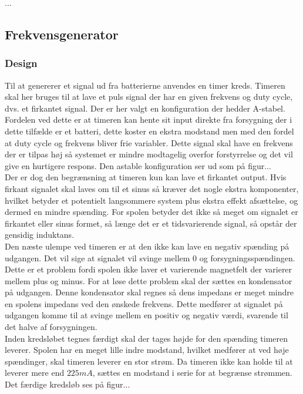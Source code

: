 ...

\subsection{Frekvensgenerator}

\subsubsection{Design}
Til at genererer et signal ud fra batterierne anvendes en timer kreds. Timeren skal her bruges til at lave et puls signal der har en given frekvens og duty cycle, dvs. et firkantet signal. Der er her valgt en konfiguration der hedder A-stabel. Fordelen ved dette er at timeren kan hente sit input direkte fra forsygning der i dette tilfælde er et batteri, dette koster en ekstra modstand men med den fordel at duty cycle og frekvens bliver frie variabler. Dette signal skal have en frekvens der er tilpas høj så systemet er mindre modtagelig overfor forstyrrelse og det vil give en hurtigere respons. Den astable konfiguration ser ud som på figur...\\

Der er dog den begrænsning at timeren kun kan lave et firkantet output. Hvis firkant signalet skal laves om til et sinus så kræver det nogle ekstra komponenter, hvilket betyder et potentielt langsommere system plus ekstra effekt afsættelse, og dermed en mindre spænding. For spolen betyder det ikke så meget om signalet er firkantet eller sinus formet, så længe det er et tidsvarierende signal, så opstår der gensidig induktans.\\

Den næste ulempe ved timeren er at den ikke kan lave en negativ spænding på udgangen. Det vil sige at signalet vil svinge mellem 0 og forsygningsspændingen. Dette er et problem fordi spolen ikke laver et varierende magnetfelt der varierer mellem plus og minus. For at løse dette problem skal der sættes en kondensator på udgangen. Denne kondensator skal regnes så dens impedans er meget mindre en spolens impedans ved den ønskede frekvens. Dette medfører at signalet på udgangen komme til at svinge mellem en positiv og negativ værdi, svarende til det halve af forsygningen.\\

Inden kredsløbet tegnes færdigt skal der tages højde for den spænding timeren leverer. Spolen har en meget lille indre modstand, hvilket medfører at ved høje spændinger, skal timeren leverer en stor strøm. Da timeren ikke kan holde til at leverer mere end $225 mA$, sættes en modstand i serie for at begrænse strømmen. Det færdige kredsløb ses på figur...

